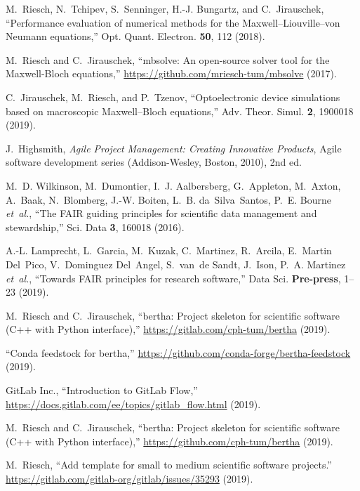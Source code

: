 \documentclass[@CLASSOPTIONS@]{tumarticle}
\begin{document}
\begin{thebibliography}{10}
  M.~Riesch, N.~Tchipev, S.~Senninger, H.-J. Bungartz, and C.~Jirauschek,
  \enquote{Performance evaluation of numerical methods for the
    {Maxwell--Liouville--von Neumann} equations,} Opt. Quant. Electron.
  \textbf{50}, 112 (2018).

  M.~Riesch and C.~Jirauschek, \enquote{mbsolve: An open-source solver tool for
    the {Maxwell-Bloch} equations,} \url{https://github.com/mriesch-tum/mbsolve}
  (2017).

  C.~Jirauschek, M.~Riesch, and P.~Tzenov, \enquote{Optoelectronic device
    simulations based on macroscopic {Maxwell--Bloch} equations,} Adv. Theor.
  Simul. \textbf{2}, 1900018 (2019).

  J.~Highsmith, \emph{Agile Project Management: Creating Innovative Products},
  Agile software development series (Addison-Wesley, Boston, 2010), 2nd ed.

  M.~D. Wilkinson, M.~Dumontier, I.~J. Aalbersberg, G.~Appleton, M.~Axton,
  A.~Baak, N.~Blomberg, J.-W. Boiten, L.~B. da~Silva~Santos, P.~E. Bourne
  \emph{et~al.}, \enquote{The {FAIR} guiding principles for scientific data
    management and stewardship,} Sci. Data \textbf{3}, 160018 (2016).

  A.-L. Lamprecht, L.~Garcia, M.~Kuzak, C.~Martinez, R.~Arcila, E.~Martin
  Del~Pico, V.~Dominguez Del~Angel, S.~van~de Sandt, J.~Ison, P.~A. Martinez
  \emph{et~al.}, \enquote{Towards {FAIR} principles for research software,}
  Data Sci. \textbf{Pre-press}, 1--23 (2019).

  M.~Riesch and C.~Jirauschek, \enquote{bertha: Project skeleton for scientific
    software ({C++} with {Python} interface),}
  \url{https://gitlab.com/cph-tum/bertha} (2019).

  \enquote{Conda feedstock for bertha,}
  \url{https://github.com/conda-forge/bertha-feedstock} (2019).

  {GitLab Inc.}, \enquote{Introduction to {GitLab} {Flow},}
  \url{https://docs.gitlab.com/ee/topics/gitlab_flow.html} (2019).

  M.~Riesch and C.~Jirauschek, \enquote{bertha: Project skeleton for scientific
    software ({C++} with {Python} interface),}
  \url{https://github.com/cph-tum/bertha} (2019).

  M.~Riesch, \enquote{Add template for small to medium scientific software
    projects.} \url{https://gitlab.com/gitlab-org/gitlab/issues/35293} (2019).


\end{thebibliography}
\end{document}
